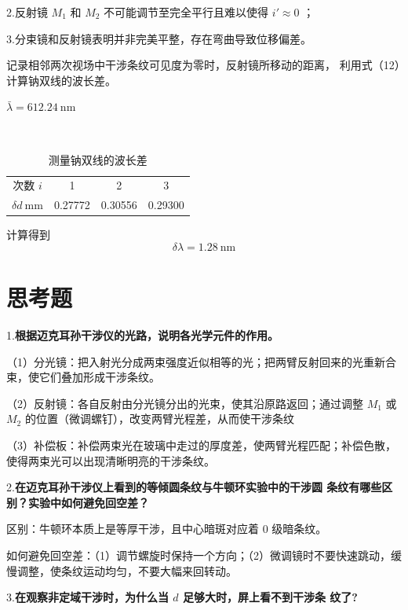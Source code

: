 \documentclass[12pt]{article}
\begin{document}
2.反射镜 $M_1$ 和 $M_2$ 不可能调节至完全平行且难以使得 $i'\approx 0$ ；

3.分束镜和反射镜表明并非完美平整，存在弯曲导致位移偏差。

记录相邻两次视场中干涉条纹可见度为零时，反射镜所移动的距离，
利用式（12）计算钠双线的波长差。
\begin{table}[H]
    \centering
    \caption{测量钠双线的波长差}
    \vspace{2pt} 
    \begin{minipage}{0.7\textwidth}
            \raggedleft
            $\bar \lambda=612.24\ \mathrm{nm}$
    \end{minipage}\\[2pt]
    \begin{tabular}{cccc}
        \hline\hline
        次数 $i$ & 1 & 2 & 3  \\ 
        $\delta d\ \mathrm{mm}$ & 0.27772 & 0.30556 & 0.29300 \\ 
        \hline\hline
    \end{tabular}
\end{table}
计算得到
\begin{equation}
    \delta \lambda=1.28\ \mathrm{nm}
\end{equation}

\section{思考题}

1.\textbf{根据迈克耳孙干涉仪的光路，说明各光学元件的作用。}

（1）分光镜：把入射光分成两束强度近似相等的光；把两臂反射回来的光重新合束，使它们叠加形成干涉条纹。

（2）反射镜：各自反射由分光镜分出的光束，使其沿原路返回；通过调整 $M_1$ 或 $M_2$ 的位置（微调螺钉），改变两臂光程差，从而使干涉条纹

（3）补偿板：补偿两束光在玻璃中走过的厚度差，使两臂光程匹配；补偿色散，使得两束光可以出现清晰明亮的干涉条纹。

2.\textbf{在迈克耳孙干涉仪上看到的等倾圆条纹与牛顿环实验中的干涉圆
条纹有哪些区别？实验中如何避免回空差？}

区别：牛顿环本质上是等厚干涉，且中心暗斑对应着 0 级暗条纹。

如何避免回空差：（1）调节螺旋时保持一个方向；（2）微调镜时不要快速跳动，缓慢调整，使条纹运动均匀，不要大幅来回转动。

3.\textbf{在观察非定域干涉时，为什么当 $d$ 足够大时，屏上看不到干涉条
纹了?}
\end{document}
